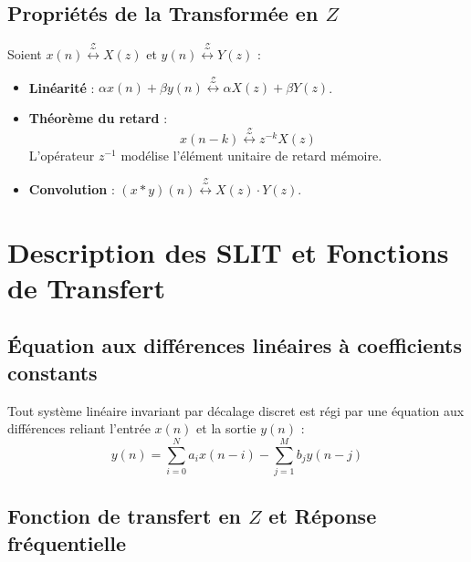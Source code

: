 \subsection{Propriétés de la Transformée en $Z$}

\begin{prop}
    Soient $x(n) \overset{\mathcal{Z}}{\longleftrightarrow} X(z)$ et $y(n) \overset{\mathcal{Z}}{\longleftrightarrow} Y(z)$ :
    \begin{itemize}
        \item \textbf{Linéarité} : $\alpha x(n) + \beta y(n) \overset{\mathcal{Z}}{\longleftrightarrow} \alpha X(z) + \beta Y(z)$.
        \item \textbf{Théorème du retard} : 
            \begin{equation}
                \boxed{x(n - k) \overset{\mathcal{Z}}{\longleftrightarrow} z^{-k} X(z)}
            \end{equation}
            L'opérateur $z^{-1}$ modélise l'élément unitaire de retard mémoire.
        \item \textbf{Convolution} : $(x * y)(n) \overset{\mathcal{Z}}{\longleftrightarrow} X(z) \cdot Y(z)$.
    \end{itemize}
\end{prop}


\section{Description des SLIT et Fonctions de Transfert}

\subsection{Équation aux différences linéaires à coefficients constants}

Tout système linéaire invariant par décalage discret est régi par une équation aux différences reliant l'entrée $x(n)$ et la sortie $y(n)$ :
\begin{equation}
    y(n) = \sum_{i=0}^N a_i x(n - i) - \sum_{j=1}^M b_j y(n - j)
\end{equation}

\subsection{Fonction de transfert en $Z$ et Réponse fréquentielle}

